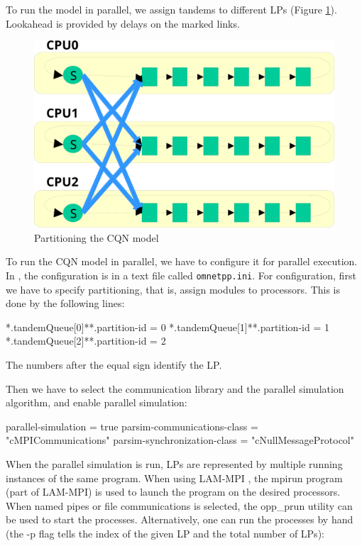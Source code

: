 To run the model in parallel, we assign tandems to different LPs
(Figure \ref{fig:cqn-partitioning}). Lookahead is provided
by delays on the marked links.

\begin{figure}[htbp]
  \begin{center}
    \includegraphics{figures/parsim-cqn-partitioning}
    \caption{Partitioning the CQN model}
    \label{fig:cqn-partitioning}
  \end{center}
\end{figure}

To run the CQN model in parallel, we have to configure it for parallel
execution. In {\opp}, the configuration is in a text file called
\texttt{omnetpp.ini}. For configuration, first we have to specify
partitioning, that is, assign modules to processors. This is done
by the following lines:

\begin{inifile}
[General]
*.tandemQueue[0]**.partition-id = 0
*.tandemQueue[1]**.partition-id = 1
*.tandemQueue[2]**.partition-id = 2
\end{inifile}

The numbers after the equal sign identify the LP.

Then we have to select the communication library and the parallel
simulation algorithm, and enable parallel simulation:

\begin{inifile}
[General]
parallel-simulation = true
parsim-communications-class = "cMPICommunications"
parsim-synchronization-class = "cNullMessageProtocol"
\end{inifile}

When the parallel simulation is run, LPs are represented
by multiple running instances of the same program.
When using LAM-MPI \cite{lammpi}, the mpirun program (part of LAM-MPI)
is used to launch the program on the desired processors.
When named pipes or file communications is selected, the opp\_prun
{\opp} utility can be used to start the processes.
Alternatively, one can run the processes by hand (the -p flag
tells {\opp} the index of the given LP and the total number of LPs):

